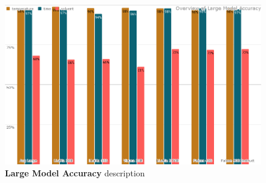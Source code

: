 \begin{figure}[!htbp]
    \begin{centering}
        \includegraphics[width=\textwidth]{img/overview_large_accuracy}
        \caption[Large Model Accuracy]{\textbf{Large Model Accuracy} description
        }
        \label{fig:7b_acc}
    \end{centering}
\end{figure}

